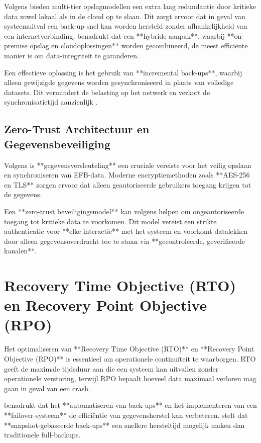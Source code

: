 \documentclass{hogent-article}
\begin{document}
        Volgens \textcite{AWSBackup} bieden multi-tier opslagmodellen een extra laag redundantie door kritieke data zowel lokaal als in de cloud op te slaan. Dit zorgt ervoor dat in geval van systeemuitval een back-up snel kan worden hersteld zonder afhankelijkheid van een internetverbinding. \textcite{MicrosoftBackup} benadrukt dat een **hybride aanpak**, waarbij **on-premise opslag en cloudoplossingen** worden gecombineerd, de meest efficiënte manier is om data-integriteit te garanderen.
        
        Een effectieve oplossing is het gebruik van **incremental back-ups**, waarbij alleen gewijzigde gegevens worden gesynchroniseerd in plaats van volledige datasets. Dit vermindert de belasting op het netwerk en verkort de synchronisatietijd aanzienlijk \autocite{VeeamRTO}.
        
        \subsection{Zero-Trust Architectuur en Gegevensbeveiliging}
        
        Volgens \textcite{NISTFIPS140} is **gegevensversleuteling** een cruciale vereiste voor het veilig opslaan en synchroniseren van EFB-data. Moderne encryptiemethoden zoals **AES-256 en TLS** zorgen ervoor dat alleen geautoriseerde gebruikers toegang krijgen tot de gegevens.
        
        Een **zero-trust beveiligingsmodel** kan volgens \textcite{VinayakBhuvi} helpen om ongeautoriseerde toegang tot kritieke data te voorkomen. Dit model vereist een strikte authenticatie voor **elke interactie** met het systeem en voorkomt datalekken door alleen gegevensoverdracht toe te staan via **gecontroleerde, geverifieerde kanalen**.
        
        \section{Recovery Time Objective (RTO) en Recovery Point Objective (RPO)}
        
        Het optimaliseren van **Recovery Time Objective (RTO)** en **Recovery Point Objective (RPO)** is essentieel om operationele continuïteit te waarborgen. RTO geeft de maximale tijdsduur aan die een systeem kan uitvallen zonder operationele verstoring, terwijl RPO bepaalt hoeveel data maximaal verloren mag gaan in geval van een crash.
        
        \textcite{VeeamRTO} benadrukt dat het **automatiseren van back-ups** en het implementeren van een **failover-systeem** de efficiëntie van gegevensherstel kan verbeteren. \textcite{MicrosoftBackup} stelt dat **snapshot-gebaseerde back-ups** een snellere hersteltijd mogelijk maken dan traditionele full-backups.
        
\end{document}
